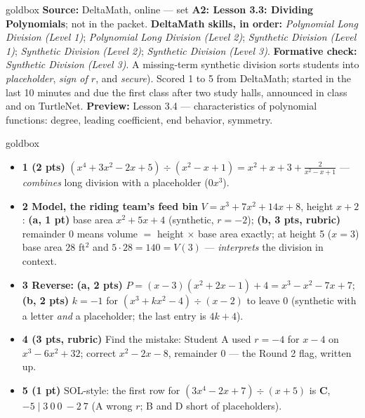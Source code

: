\documentclass[10pt]{article}
\begin{document}
\boxguard
\begin{skillbox}{goldbox}
\textbf{Source:} DeltaMath, online --- set \textbf{A2: Lesson 3.3: Dividing Polynomials}; not in
the packet. \textbf{DeltaMath skills, in order:} \emph{Polynomial Long Division (Level 1)}; \emph{Polynomial Long Division (Level 2)}; \emph{Synthetic Division (Level 1)}; \emph{Synthetic Division (Level 2)}; \emph{Synthetic Division (Level 3)}. \textbf{Formative check:} \emph{Synthetic Division (Level 3)}. A missing-term synthetic division sorts
students into \emph{placeholder}, \emph{sign of $r$}, and \emph{secure}). Scored 1 to 5 from
DeltaMath; started in the last 10 minutes and due the first class after two study halls,
announced in class and on TurtleNet. \textbf{Preview:} Lesson 3.4 --- characteristics of
polynomial functions: degree, leading coefficient, end behavior, symmetry.
\end{skillbox}

\boxguard
\begin{skillbox}{goldbox}
\begin{itemize}[leftmargin=1.2em, nosep, itemsep=2pt]
  \item \textbf{1 (2 pts)} $(x^4 + 3x^2 - 2x + 5) \div (x^2 - x + 1) = x^2 + x + 3 +
        \frac{2}{x^2 - x + 1}$ --- \emph{combines} long division with a placeholder ($0x^3$).
  \item \textbf{2 Model, the riding team's feed bin} $V = x^3 + 7x^2 + 14x + 8$, height $x + 2$:
        \textbf{(a, 1 pt)} base area $x^2 + 5x + 4$ (synthetic, $r = -2$); \textbf{(b, 3 pts,
        rubric)} remainder $0$ means volume $=$ height $\times$ base area exactly; at height 5
        ($x = 3$) base area $28$ ft$^2$ and $5\cdot28 = 140 = V(3)$ --- \emph{interprets} the
        division in context.
  \item \textbf{3 Reverse:} \textbf{(a, 2 pts)} $P = (x - 3)(x^2 + 2x - 1) + 4 = x^3 - x^2 - 7x
        + 7$; \textbf{(b, 2 pts)} $k = -1$ for $(x^3 + kx^2 - 4) \div (x - 2)$ to leave $0$
        (synthetic with a letter \emph{and} a placeholder; the last entry is $4k + 4$).
  \item \textbf{4 (3 pts, rubric)} Find the mistake: Student A used $r = -4$ for $x - 4$ on
        $x^3 - 6x^2 + 32$; correct $x^2 - 2x - 8$, remainder $0$ --- the Round 2 flag, written up.
  \item \textbf{5 (1 pt)} SOL-style: the first row for $(3x^4 - 2x + 7) \div (x + 5)$ is
        \textbf{C}, $-5 \mid 3\ 0\ 0\ -2\ 7$ (A wrong $r$; B and D short of placeholders).
\end{itemize}
\end{skillbox}
\end{document}
